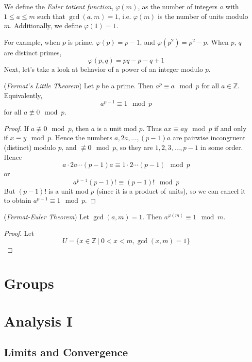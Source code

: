 \documentclass[10pt, a4paper, twoside]{report}
\begin{document}
\begin{definition}
    We define the \emph{Euler totient function}, \(\varphi(m)\), as the number of integers \(a\) with \(1\leq a\leq m\) such that \(\gcd(a,m)=1\), i.e. \(\varphi(m)\) is the number of units modulo \(m\). Additionally, we define \(\varphi(1)=1\).
\end{definition}
For example, when \(p\) is prime, \(\varphi(p)=p-1\), and \(\varphi(p^2)=p^2-p\). When \(p\), \(q\) are distinct primes,
\[\varphi(p,q)=pq-p-q+1\]
Next, let's take a look at behavior of a power of an integer modulo \(p\).
\begin{theorem}
    (\emph{Fermat's Little Theorem})
    Let \(p\) be a prime. Then \(a^p\equiv a\mod p\) for all \(a\in\mathbb{Z}\). Equivalently, 
    \[a^{p-1}\equiv 1\mod p\]
    for all \(a\nequiv 0\mod p\).
    \label{thm:flt}
\end{theorem}
\begin{proof}
    If \(a\nequiv 0\mod p\), then \(a\) is a unit mod \(p\). Thus \(ax\equiv ay\mod p\) if and only if \(x\equiv y\mod p\). Hence the numbers \(a,2a,\ldots,(p-1)a\) are pairwise incongruent (distinct) modulo \(p\), and \(\nequiv 0\mod p\), so they are \(1,2,3,\ldots,p-1\) in some order. Hence 
    \[a\cdot 2a\cdots(p-1)a\equiv 1\cdot2\cdots(p-1)\mod p\]
    or 
    \[a^{p-1}(p-1)!\equiv(p-1)!\mod p\]
    But \((p-1)!\) is a unit mod \(p\) (since it is a product of units), so we can cancel it to obtain \(a^{p-1}\equiv 1\mod p\).
\end{proof}
\begin{theorem}
    (\emph{Fermat-Euler Theorem}) Let \(\gcd(a,m)=1\). Then \(a^{\varphi(m)}\equiv 1\mod m\).
    \label{thm:euler}
\end{theorem}
\begin{proof}
    Let 
    \[U=\{x\in\mathbb{Z}\:|\:0<x<m,\gcd(x,m)=1\}\]
\end{proof}
\chapter{Groups}
\chapter{Analysis I}
\section{Limits and Convergence}
\end{document}
